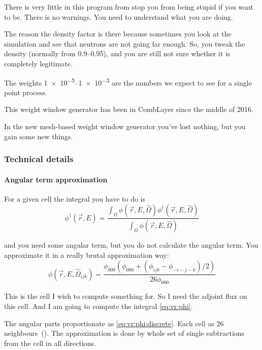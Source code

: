 There is very little in this program from stop you from being stupid if you want to be.
There is no warnings. You need to understand what you are doing.

The reason the density factor is there because sometimes you look at the simulation and see that neutrons are not going far enough.
So, you tweak the density (normally from \numrange{0.9}{0.95}), and you are still not sure whether it is completely legitimate.

The weights \numrange[retain-unity-mantissa=false, range-phrase=\ --\ ]{1e-5}{1e-3} are the numbers we expect to see for a single point process.

This weight window generator has been in CombLayer since the middle of 2016.

\bigskip

In the new mesh-based weight window generator you've lost nothing, but you gain some new things.


\subsubsection{Technical details}

\paragraph{Angular term approximation}

For a given cell the integral you have to do is 
\begin{equation}
\label{eq:vr:phi}
  \phi^\dag(\vec{r},E) = \frac{\int_\Omega \phi(\vec{r},E,\hat{\Omega})
    \phi^\dag(\vec{r},E,\hat{\Omega}) }
  {\int_\Omega \phi(\vec{r},E,\hat{\Omega}) }
\end{equation}

and you need some angular term, but you do not calculate the angular term. You approximate it in a really brutal approximation way:
\begin{equation}
  \label{eq:vr:phi:discrete}
  \phi(\vec{r},E,\hat\Omega_{ijk})=
  \frac{\phi_{000} (\phi_{000}+(\phi_{ijk} - \phi_{-i-j-k})/2) }
  { 26 \phi_{000} }
\end{equation}

This is the cell I wish to compute something for. So I need the adjoint flux on this cell.
And I am going to compute the integral \eqref{eq:vr:phi}.

The angular parts proportionate as \eqref{eq:vr:phi:discrete}.
Each cell as 26 neighbours~(). The approximation is done by whole set of single subtractions from the cell in all directions.

